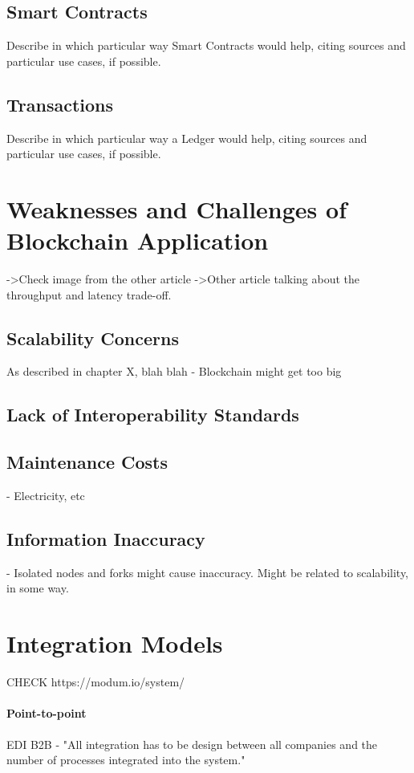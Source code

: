 \subsection{Smart Contracts}
Describe in which particular way Smart Contracts would help, citing sources and particular use cases, if possible. 
        
\subsection{Transactions}
Describe in which particular way a Ledger would help, citing sources and particular use cases, if possible.

\section{Weaknesses and Challenges of Blockchain Application}
->Check image from the other article
->Other article talking about the throughput and latency trade-off.
\subsection{Scalability Concerns}
As described in chapter X, blah blah
- Blockchain might get too big
\subsection{Lack of Interoperability Standards}

\subsection{Maintenance Costs}
- Electricity, etc
        
\subsection{Information Inaccuracy}        
- Isolated nodes and forks might cause inaccuracy. Might be related to scalability, in some way.

\section{Integration Models}
CHECK https://modum.io/system/

\paragraph{Point-to-point} EDI B2B - "All
integration has to be design between all companies and
the number of processes integrated into the system."
        
